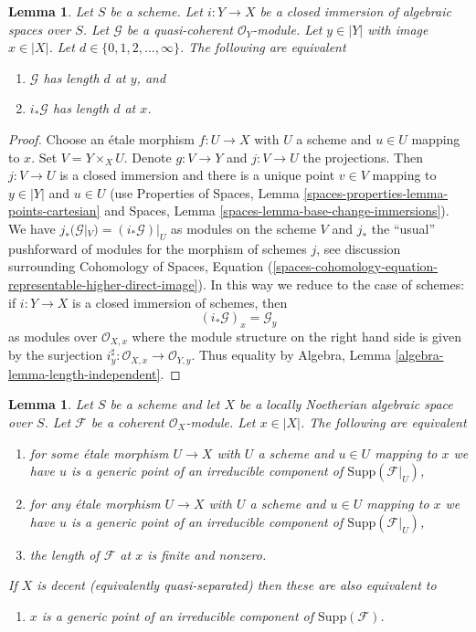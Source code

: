 \documentclass{stacks-project}
\theoremstyle{plain}
\newtheorem{lemma}[subsection]{Lemma}
\theoremstyle{definition}
\theoremstyle{remark}
\numberwithin{equation}{subsection}
\begin{document}
\begin{lemma}
\label{lemma-length-closed-immersion}
Let $S$ be a scheme. Let $i : Y \to X$ be a closed immersion of
algebraic spaces over $S$. Let $\mathcal{G}$ be a quasi-coherent
$\mathcal{O}_Y$-module. Let $y \in |Y|$ with image $x \in |X|$.
Let $d \in \{0, 1, 2, \ldots, \infty\}$. The following are
equivalent
\begin{enumerate}
\item $\mathcal{G}$ has length $d$ at $y$, and
\item $i_*\mathcal{G}$ has length $d$ at $x$.
\end{enumerate}
\end{lemma}

\begin{proof}
Choose an \'etale morphism $f : U \to X$ with $U$ a scheme
and $u \in U$ mapping to $x$. Set $V = Y \times_X U$.
Denote $g : V \to Y$ and $j : V \to U$ the projections.
Then $j : V \to U$ is a closed immersion and there is a unique
point $v \in V$ mapping to $y \in |Y|$ and $u \in U$
(use Properties of Spaces, Lemma \ref{spaces-properties-lemma-points-cartesian}
and Spaces, Lemma \ref{spaces-lemma-base-change-immersions}).
We have $j_*(\mathcal{G}|_V) = (i_*\mathcal{G})|_U$ as modules
on the scheme $V$ and $j_*$ the ``usual'' pushforward of modules
for the morphism of schemes $j$, see discussion surrounding
Cohomology of Spaces, Equation
(\ref{spaces-cohomology-equation-representable-higher-direct-image}).
In this way we reduce to the case of schemes: if $i : Y \to X$
is a closed immersion of schemes, then
$$
(i_*\mathcal{G})_x = \mathcal{G}_y
$$
as modules over $\mathcal{O}_{X, x}$ where the module structure
on the right hand side is given by the surjection
$i_y^\sharp : \mathcal{O}_{X, x} \to \mathcal{O}_{Y, y}$.
Thus equality by
Algebra, Lemma \ref{algebra-lemma-length-independent}.
\end{proof}

\begin{lemma}
\label{lemma-length-finite}
Let $S$ be a scheme and let $X$ be a
locally Noetherian algebraic space over $S$.
Let $\mathcal{F}$ be a coherent $\mathcal{O}_X$-module.
Let $x \in |X|$. The following are equivalent
\begin{enumerate}
\item for some \'etale morphism $U \to X$ with $U$ a scheme
and $u \in U$ mapping to $x$ we have $u$ is a generic point
of an irreducible component of $\text{Supp}(\mathcal{F}|_U)$,
\item for any \'etale morphism $U \to X$ with $U$ a scheme
and $u \in U$ mapping to $x$ we have $u$ is a generic point
of an irreducible component of $\text{Supp}(\mathcal{F}|_U)$,
\item the length of $\mathcal{F}$ at $x$ is finite and nonzero.
\end{enumerate}
If $X$ is decent (equivalently quasi-separated) then these are
also equivalent to
\begin{enumerate}
\item[(4)] $x$ is a generic point of an irreducible component of
$\text{Supp}(\mathcal{F})$.
\end{enumerate}
\end{lemma}
\end{document}
